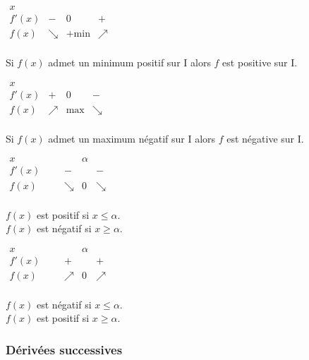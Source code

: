 
$\begin{array}{c|ccccc}
x &        &  &       &       \\
\hline
f'(x) & - & 0       & +     &       \\
\hline
f(x) & \searrow & \text{+min} & \nearrow & \\
\end{array}
$

Si  $f(x)$  admet un minimum positif  
sur  I  alors  $f$  est positive sur  I.
\bigskip


$\begin{array}{c|ccccc}
x &        &  &       &       \\
\hline
f'(x) & + & 0       & -     &       \\
\hline
f(x) & \nearrow & \text{max} & \searrow & \\
\end{array}
$

Si  $f(x)$ admet un maximum négatif 
sur  I  alors $ f$  est  négative sur  I.

$\begin{array}{c|ccccccc}
x &        &        &        & \alpha &        &        &        \\
\hline
f'(x) &     &        & -      &        &   -     &        &        \\
\hline
f(x)  &     &        & \searrow & 0      & \searrow &        &        \\
\end{array}
$

$f(x)$  est positif si $x \leq \alpha$. \\
$f(x)$  est négatif si $x \geq \alpha$.

$\begin{array}{c|ccccccc}
x &        &        &        & \alpha &        &        &        \\
\hline
f'(x) &     &        & +      &        & +      &        &        \\
\hline
f(x)  &     &        & \nearrow & 0      & \nearrow &        &        \\
\end{array}
$

$f(x)$  est négatif si $x \leq \alpha$. \\
$f(x)$  est positif si  $ x \geq\alpha$.




 \subsubsection*{Dérivées successives}

